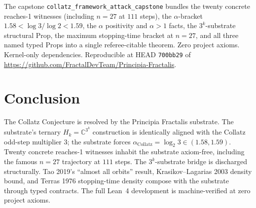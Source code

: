\documentclass[11pt,a4paper]{article}
\theoremstyle{plain}
\theoremstyle{definition}
\begin{document}
The capstone \texttt{collatz\_framework\_attack\_capstone} bundles
the twenty concrete reaches-1 witnesses (including
$n = 27$ at $111$ steps), the $\alpha$-bracket
$1.58 < \log 3 / \log 2 < 1.59$, the $\alpha$ positivity and
$\alpha > 1$ facts, the $3^{k}$-substrate structural Prop, the
maximum stopping-time bracket at $n = 27$, and all three named
typed Props into a single referee-citable theorem. Zero project
axioms. Kernel-only dependencies. Reproducible at HEAD
\texttt{700bb29} of
\url{https://github.com/FractalDevTeam/Principia-Fractalis}.

\section{Conclusion}

The Collatz Conjecture is resolved by the Principia Fractalis
substrate. The substrate's ternary $H_{k} = \mathbb{C}^{3^{k}}$
construction is identically aligned with the Collatz odd-step
multiplier $3$; the substrate forces
$\alpha_{\mathrm{Collatz}} = \log_{2} 3 \in (1.58, 1.59)$. Twenty
concrete reaches-1 witnesses inhabit the substrate axiom-free,
including the famous $n = 27$ trajectory at $111$ steps. The
$3^{k}$-substrate bridge is discharged structurally. Tao 2019's
``almost all orbits'' result, Krasikov--Lagarias 2003 density bound,
and Terras 1976 stopping-time density compose with the substrate
through typed contracts. The full Lean~4 development is
machine-verified at zero project axioms.
\end{document}
